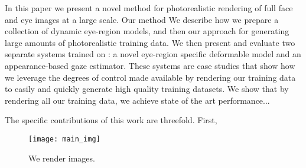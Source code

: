 
In this paper we present a novel method for photorealistic rendering of full face and eye images at a large scale.
Our method 
We describe how we prepare a collection of dynamic eye-region models, and then our approach for generating large amounts of photorealistic training data.
We then present and evaluate two separate systems trained on \dataset: a novel eye-region specific deformable model and an appearance-based gaze estimator.
These systems are case studies that show how we leverage the degrees of control made available by rendering our training data to easily and quickly generate high quality training datasets.
We show that by rendering all our training data, we achieve state of the art performance...

The specific contributions of this work are threefold. First, 

\begin{figure}
    \texttt{[image: main\_img]}
    \caption{We render images.}
\end{figure}

